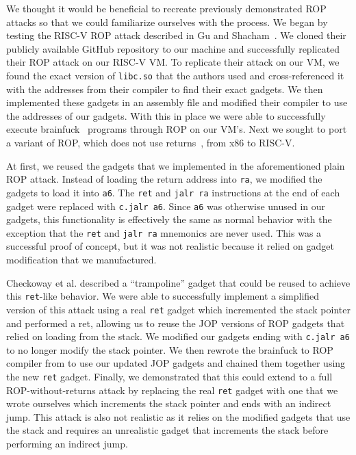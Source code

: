We thought it would be beneficial to recreate previously demonstrated ROP attacks
so that we could familiarize ourselves with the process. We began by testing the
RISC-V ROP attack described in Gu and Shacham~\cite{gu20ropriscv}. We cloned
their publicly available GitHub repository to our machine and successfully
replicated their ROP attack on our RISC-V VM. To replicate their attack on our VM, we
found the exact version of \verb|libc.so| that the authors used and cross-referenced
it with the addresses from their compiler to find their exact gadgets. We then
implemented these gadgets in an assembly file and modified their compiler to use
the addresses of our gadgets. With this in place we were able to successfully execute
brainfuck~\cite{gu20ropriscv,brainfuck} programs through ROP on our VM's. Next we sought to port a variant of
ROP, which does not use returns~\cite{checkoway10ropnoret}, from x86 to RISC-V.

At first, we reused the gadgets that we implemented in the aforementioned plain ROP
attack. Instead of loading the return address into \verb|ra|, we modified the
gadgets to load it into \verb|a6|. The \verb|ret| and \verb|jalr ra|
instructions at the end of each gadget were replaced with \verb|c.jalr a6|.
Since \verb|a6| was otherwise unused in our gadgets, this functionality is
effectively the same as normal behavior with the exception that the \verb|ret|
and \verb|jalr ra| mnemonics are never used. This was a successful proof of
concept, but it was not realistic because it relied on gadget modification that
we manufactured.

Checkoway et al. described a ``trampoline'' gadget that could be reused to
achieve this \verb|ret|-like behavior. We were able to successfully implement
a simplified version of this attack using a real \verb|ret| gadget which incremented
the stack pointer and performed a ret, allowing us to reuse the JOP versions of ROP gadgets that
relied on loading from the stack. We modified our gadgets ending with \verb|c.jalr a6|
to no longer modify the stack pointer. We then rewrote the brainfuck to ROP compiler
from \cite{gu20ropriscv} to use our updated JOP gadgets and chained them together
using the new \verb|ret| gadget. Finally, we demonstrated that this could extend to a
full ROP-without-returns attack by replacing the real \verb|ret| gadget with one
that we wrote ourselves which increments the stack pointer and ends with an indirect jump.
This attack is also not realistic as it relies on the modified gadgets that use the stack
and requires an unrealistic gadget that increments the stack before performing an indirect jump.

